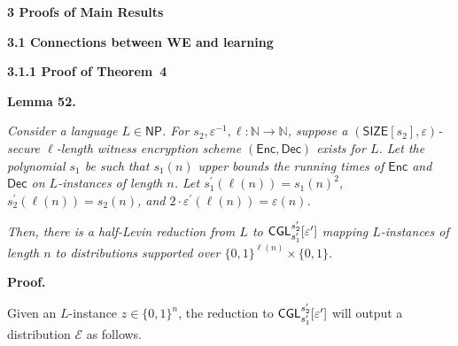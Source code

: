 \par\medskip\noindent\textbf{
3 Proofs of Main Results}\par




\par\medskip\noindent\textbf{
3.1 Connections between WE and learning}\par




\par\medskip\noindent\textbf{
3.1.1 Proof of Theorem 4
}\par





\par\medskip\noindent\textbf{
\textbf{Lemma 52}\textbf{.}
}\par



\emph{Consider a language $L\in{\mathsf{NP}}$. For $s_{2},\varepsilon^{-1},\ell:\mathbb{N}\to\mathbb{N}$, suppose a $({\mathsf{SIZE}}[s_{2}],\varepsilon)$-secure $\ell$-length witness encryption scheme $({\mathsf{Enc}},{\mathsf{Dec}})$ exists for $L$. Let the polynomial $s_{1}$ be such that $s_{1}(n)$ upper bounds the running times of ${\mathsf{Enc}}$ and ${\mathsf{Dec}}$ on $L$-instances of length $n$. Let $s^{\prime}_{1}(\ell(n))=s_{1}(n)^{2}$, $s^{\prime}_{2}(\ell(n))=s_{2}(n)$, and $2\cdot\varepsilon^{\prime}(\ell(n))=\varepsilon(n)$.}\par




\emph{Then, there is a half-Levin reduction from $L$ to ${\sf CGL}_{s_{1}^{\prime}}^{s_{2}^{\prime}}[\varepsilon^{\prime}]$ mapping $L$-instances of length $n$ to distributions supported over $\{0,1\}^{\ell(n)}\times\{0,1\}$.}\par






\par\medskip\noindent\textbf{Proof.}\par




Given an $L$-instance $z\in\{0,1\}^{n}$, the reduction to ${\sf CGL}_{s_{1}^{\prime}}^{s_{2}^{\prime}}[\varepsilon^{\prime}]$ will output a distribution $\mathcal{E}$ as follows.\par




